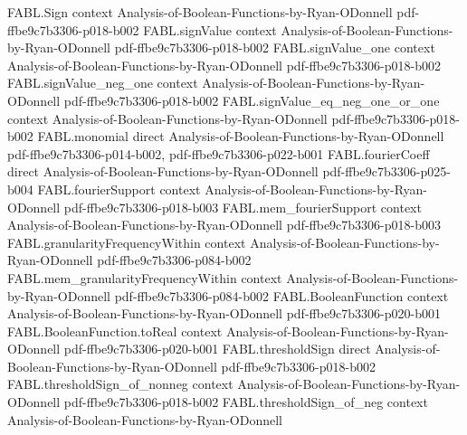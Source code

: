 \begin{theorem}
\label{FABL.sum_fourierCoeff_singleton_le_majority}
\leanok
{}
\proofstep
  {FABL.Sign}
  {context}
  {Analysis-of-Boolean-Functions-by-Ryan-ODonnell}
  {pdf-ffbe9c7b3306-p018-b002}
\proofstep
  {FABL.signValue}
  {context}
  {Analysis-of-Boolean-Functions-by-Ryan-ODonnell}
  {pdf-ffbe9c7b3306-p018-b002}
\proofstep
  {FABL.signValue_one}
  {context}
  {Analysis-of-Boolean-Functions-by-Ryan-ODonnell}
  {pdf-ffbe9c7b3306-p018-b002}
\proofstep
  {FABL.signValue_neg_one}
  {context}
  {Analysis-of-Boolean-Functions-by-Ryan-ODonnell}
  {pdf-ffbe9c7b3306-p018-b002}
\proofstep
  {FABL.signValue_eq_neg_one_or_one}
  {context}
  {Analysis-of-Boolean-Functions-by-Ryan-ODonnell}
  {pdf-ffbe9c7b3306-p018-b002}
\proofstep
  {FABL.monomial}
  {direct}
  {Analysis-of-Boolean-Functions-by-Ryan-ODonnell}
  {pdf-ffbe9c7b3306-p014-b002,
    pdf-ffbe9c7b3306-p022-b001}
\proofstep
  {FABL.fourierCoeff}
  {direct}
  {Analysis-of-Boolean-Functions-by-Ryan-ODonnell}
  {pdf-ffbe9c7b3306-p025-b004}
\proofstep
  {FABL.fourierSupport}
  {context}
  {Analysis-of-Boolean-Functions-by-Ryan-ODonnell}
  {pdf-ffbe9c7b3306-p018-b003}
\proofstep
  {FABL.mem_fourierSupport}
  {context}
  {Analysis-of-Boolean-Functions-by-Ryan-ODonnell}
  {pdf-ffbe9c7b3306-p018-b003}
\proofstep
  {FABL.granularityFrequencyWithin}
  {context}
  {Analysis-of-Boolean-Functions-by-Ryan-ODonnell}
  {pdf-ffbe9c7b3306-p084-b002}
\proofstep
  {FABL.mem_granularityFrequencyWithin}
  {context}
  {Analysis-of-Boolean-Functions-by-Ryan-ODonnell}
  {pdf-ffbe9c7b3306-p084-b002}
\proofstep
  {FABL.BooleanFunction}
  {context}
  {Analysis-of-Boolean-Functions-by-Ryan-ODonnell}
  {pdf-ffbe9c7b3306-p020-b001}
\proofstep
  {FABL.BooleanFunction.toReal}
  {context}
  {Analysis-of-Boolean-Functions-by-Ryan-ODonnell}
  {pdf-ffbe9c7b3306-p020-b001}
\proofstep
  {FABL.thresholdSign}
  {direct}
  {Analysis-of-Boolean-Functions-by-Ryan-ODonnell}
  {pdf-ffbe9c7b3306-p018-b002}
\proofstep
  {FABL.thresholdSign_of_nonneg}
  {context}
  {Analysis-of-Boolean-Functions-by-Ryan-ODonnell}
  {pdf-ffbe9c7b3306-p018-b002}
\proofstep
  {FABL.thresholdSign_of_neg}
  {context}
  {Analysis-of-Boolean-Functions-by-Ryan-ODonnell}

\end{theorem}
